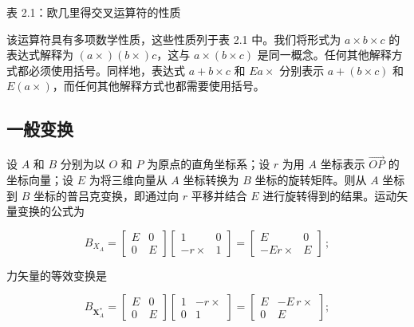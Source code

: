 \documentclass[10pt,a4paper]{book}
\theoremstyle{thmstyle} %
\theoremstyle{defstyle} %
\theoremstyle{prostyle} %
\begin{document}
表 2.1：欧几里得交叉运算符的性质



该运算符具有多项数学性质，这些性质列于表 2.1 中。我们将形式为 $a \times b \times c$ 的表达式解释为 $(a \times)(b \times)c$，这与 $a \times (b \times c)$ 是同一概念。任何其他解释方式都必须使用括号。同样地，表达式 $a + b \times c$ 和 $E a \times$ 分别表示 $a + (b \times c)$ 和 $E (a \times)$，而任何其他解释方式也都需要使用括号。



\subsection{一般变换}





设 $A$ 和 $B$ 分别为以 $O$ 和 $P$ 为原点的直角坐标系；设 $r$ 为用 $A$ 坐标表示 $\overrightarrow{OP}$ 的坐标向量；设 $E$ 为将三维向量从 $A$ 坐标转换为 $B$ 坐标的旋转矩阵。则从 $A$ 坐标到 $B$ 坐标的普吕克变换，即通过向 $r$ 平移并结合 $E$ 进行旋转得到的结果。运动矢量变换的公式为



$$
B _ { X _ { A } } = { \left[ \begin{array}{ll} { E } & { 0 } \\{ 0 } & { E } \end{array} \right] } { \left[ \begin{array}{ll} { 1 } & { 0 } \\{ - r \times } & { 1 } \end{array} \right] } = { \left[ \begin{array}{ll} { E } & { 0 } \\{ - E r \times } & { E } \end{array} \right] } \, ;
$$



力矢量的等效变换是



$$
B _ { \mathbf { X } _ { A } ^{*} } = { \left[ \begin{array}{ll} { E } & { 0 } \\{ 0 } & { E } \end{array} \right] } { \left[ \begin{array}{ll} { 1 } & { - r \times } \\{ 0 } & { 1 } \end{array} \right] } = { \left[ \begin{array}{ll} { E } & { - E \, r \times } \\{ 0 } & { E } \end{array} \right] } ;
$$
\end{document}
